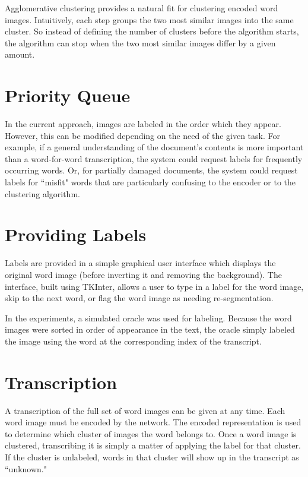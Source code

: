 \documentclass[final]{ukthesis}
\begin{document}
Agglomerative clustering provides a natural fit for clustering encoded word images. Intuitively, each step groups the two most similar images into the same cluster. So instead of defining the number of clusters before the algorithm starts, the algorithm can stop when the two most similar images differ by a given amount.


\section{Priority Queue}
In the current approach, images are labeled in the order which they appear. However, this can be modified depending on the need of the given task. For example, if a general understanding of the document's contents is more important than a word-for-word transcription, the system could request labels for frequently occurring words. Or, for partially damaged documents, the system could request labels for ``misfit" words that are particularly confusing to the encoder or to the clustering algorithm.


\section{Providing Labels}
Labels are provided in a simple graphical user interface which displays the original word image (before inverting it and removing the background). The interface, built using TKInter, allows a user to type in a label for the word image, skip to the next word, or flag the word image as needing re-segmentation.

In the experiments, a simulated oracle was used for labeling. Because the word images were sorted in order of appearance in the text, the oracle simply labeled the image using the word at the corresponding index of the transcript.


\section{Transcription}
A transcription of the full set of word images can be given at any time. Each word image must be encoded by the network. The encoded representation is used to determine which cluster of images the word belongs to. Once a word image is clustered, transcribing it is simply a matter of applying the label for that cluster. If the cluster is unlabeled, words in that cluster will show up in the transcript as ``unknown." 




%
%
%
\end{document}
